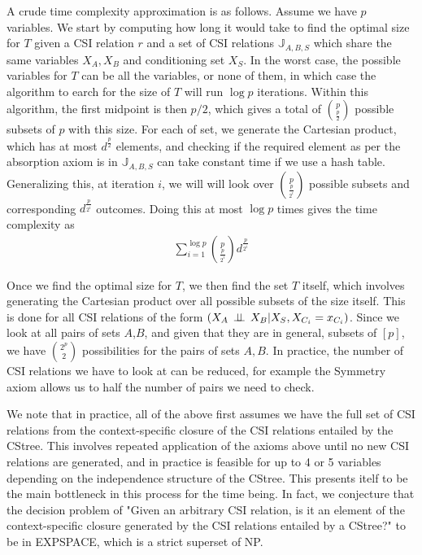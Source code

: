 \documentclass{tufte-book}
\begin{document}
A crude time complexity approximation is as follows. Assume we have \(p\) variables. We start by computing how long it would take to find the optimal size for \(T\) given a CSI relation \(r\) and a set of CSI relations \(\mathbb{J}_{A,B,S}\) which share the same variables \(X_A,X_B\) and conditioning set \(X_S\). In the worst case, the possible variables for \(T\) can be all the variables, or none of them, in which case the algorithm to earch for the size of \(T\) will run \(\log p\) iterations. Within this algorithm, the first midpoint is then \(p/2\), which gives a total of \(p\choose \frac{p}{2}\) possible subsets of \(p\) with this size. For each of set, we generate the Cartesian product, which has at most \(d^{\frac{p}{2}}\) elements, and checking if the required element as per the absorption axiom is in \(\mathbb{J}_{A,B,S}\) can take constant time if we use a hash table. Generalizing this, at iteration \(i\), we will will look over \(p \choose \frac{p}{2^i}\) possible subsets and corresponding \(d^{\frac{p}{2^i}}\) outcomes. Doing this at most \(\log p\) times gives the time complexity as
\begin{align*}
\sum_{i=1}^{\log p} {p\choose{\frac{p}{2^i}}}d^{\frac{p}{2^i}}
\end{align*}

Once we find the optimal size for \(T\), we then find the set \(T\) itself, which involves generating the Cartesian product over all possible subsets of the size itself. This is done for all CSI relations of the form \((X_A\,\perp \!\!\! \perp\,X_B|X_S,X_{C_i}=x_{C_i})\). Since we look at all pairs of sets \(A\),\(B\), and given that they are in general, subsets of \([p]\), we have \(2^p \choose 2\) possibilities for the pairs of sets \(A,B\). In practice, the number of CSI relations we have to look at can be reduced, for example the Symmetry axiom allows us to half the number of pairs we need to check.


We note that in practice, all of the above first assumes we have the full set of CSI relations from the context-specific closure of the CSI relations entailed by the CStree. This involves repeated application of the axioms above until no new CSI relations are generated, and in practice is feasible for up to 4 or 5 variables depending on the independence structure of the CStree. This presents itelf to be the main bottleneck in this process for the time being. In fact, we conjecture that the decision problem of "Given an arbitrary CSI relation, is it an element of the context-specific closure generated by the CSI relations entailed by a CStree?" to be in EXPSPACE, which is a strict superset of NP.  
\end{document}

